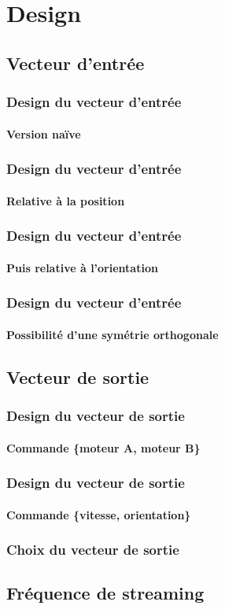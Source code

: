 \section{Design}
\subsection{Vecteur d'entrée}

\begin{frame}
 \frametitle{Design du vecteur d'entrée}
 \framesubtitle{Version naïve}
 
\end{frame}

\begin{frame}
 \frametitle{Design du vecteur d'entrée}
 \framesubtitle{Relative à la position}
 
\end{frame}

\begin{frame}
 \frametitle{Design du vecteur d'entrée}
 \framesubtitle{Puis relative à l'orientation}
 
\end{frame}

\begin{frame}
 \frametitle{Design du vecteur d'entrée}
 \framesubtitle{Possibilité d'une symétrie orthogonale}
 
\end{frame}

\subsection{Vecteur de sortie}

\begin{frame}
 \frametitle{Design du vecteur de sortie}
 \framesubtitle{Commande \{moteur A, moteur B\}}
 
\end{frame}

\begin{frame}
 \frametitle{Design du vecteur de sortie}
 \framesubtitle{Commande \{vitesse, orientation\}}
 
\end{frame}

\begin{frame}
 \frametitle{Choix du vecteur de sortie}
 
\end{frame}

\subsection{Fréquence de streaming}

